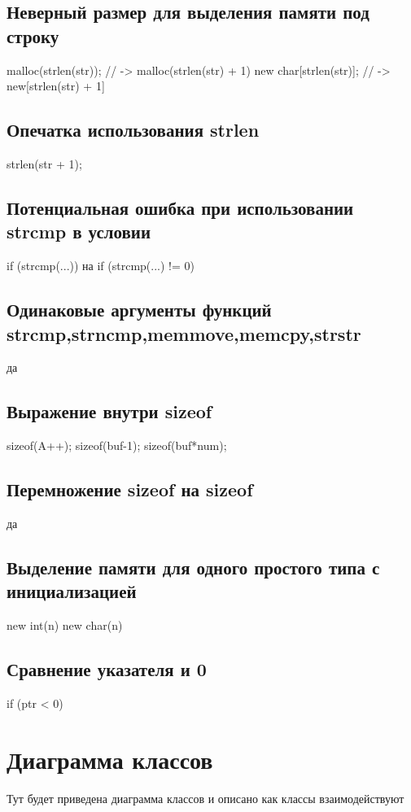 \subsection{Неверный размер для выделения памяти под строку}
malloc(strlen(str)); // -> malloc(strlen(str) + 1)
new char[strlen(str)]; // -> new[strlen(str) + 1]

\subsection{Опечатка использования strlen}
strlen(str + 1);

\subsection{Потенциальная ошибка при использовании strcmp в условии}
 if (strcmp(...)) на if (strcmp(...) != 0)
 
\subsection{Одинаковые аргументы функций strcmp,strncmp,memmove,memcpy,strstr}
да

\subsection{Выражение внутри sizeof}
sizeof(A++);
sizeof(buf-1);
sizeof(buf*num);

\subsection{Перемножение sizeof на sizeof}
да 

\subsection{Выделение памяти для одного простого типа с инициализацией}
new int(n)
new char(n)

\subsection{Сравнение указателя и 0}
if (ptr < 0)


\section{Диаграмма классов}
Тут будет приведена диаграмма классов и описано как классы взаимодействуют

